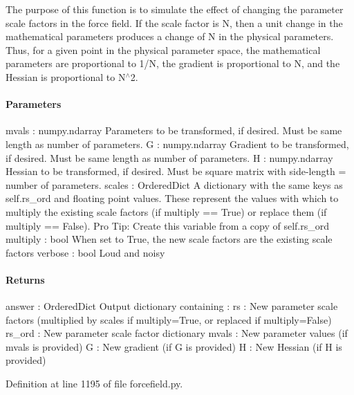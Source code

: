 The purpose of this function is to simulate the effect of changing the parameter scale factors in the force field. If the scale factor is N, then a unit change in the mathematical parameters produces a change of N in the physical parameters. Thus, for a given point in the physical parameter space, the mathematical parameters are proportional to 1/N, the gradient is proportional to N, and the Hessian is proportional to N$^\wedge$2.

\paragraph*{Parameters }

mvals \+: numpy.\+ndarray Parameters to be transformed, if desired. Must be same length as number of parameters. G \+: numpy.\+ndarray Gradient to be transformed, if desired. Must be same length as number of parameters. H \+: numpy.\+ndarray Hessian to be transformed, if desired. Must be square matrix with side-\/length = number of parameters. scales \+: Ordered\+Dict A dictionary with the same keys as self.\+rs\+\_\+ord and floating point values. These represent the values with which to multiply the existing scale factors (if multiply == True) or replace them (if multiply == False). Pro Tip\+: Create this variable from a copy of self.\+rs\+\_\+ord multiply \+: bool When set to True, the new scale factors are the existing scale factors verbose \+: bool Loud and noisy

\paragraph*{Returns }

answer \+: Ordered\+Dict Output dictionary containing \+: \textquotesingle{}rs\textquotesingle{} \+: New parameter scale factors (multiplied by scales if multiply=True, or replaced if multiply=False) \textquotesingle{}rs\+\_\+ord\textquotesingle{} \+: New parameter scale factor dictionary \textquotesingle{}mvals\textquotesingle{} \+: New parameter values (if mvals is provided) \textquotesingle{}G\textquotesingle{} \+: New gradient (if G is provided) \textquotesingle{}H\textquotesingle{} \+: New Hessian (if H is provided) 

Definition at line 1195 of file forcefield.\+py.

\mbox{\label{classsrc_1_1forcefield_1_1FF_add591c39f6d9a4965a7c0ecefae232f6}} 
